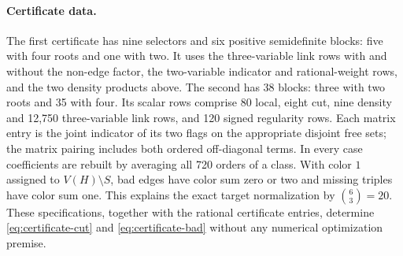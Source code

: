 \documentclass[11pt]{article}
\begin{document}
\begin{appendices}
\paragraph{Certificate data.}
The first certificate has nine selectors and six positive semidefinite
blocks: five with four roots and one with two. It uses the three-variable
link rows with and without the non-edge factor, the two-variable
indicator and rational-weight rows, and the two density products above.
The second has 38 blocks: three with two roots and 35 with four.
Its scalar rows comprise 80 local, eight cut, nine density and 12,750
three-variable link rows, and 120 signed regularity rows.
Each matrix entry is the joint indicator of its two flags on the
appropriate disjoint free sets; the matrix pairing includes both
ordered off-diagonal terms. In every case coefficients are rebuilt by
averaging all 720 orders of a class. With color $1$ assigned to
$V(H)\setminus S$, bad edges have color sum zero or two and missing
triples have color sum one. This explains the exact target normalization
by $\binom63=20$. These specifications, together with the rational
certificate entries, determine \eqref{eq:certificate-cut} and
\eqref{eq:certificate-bad} without any numerical optimization premise.

\end{appendices}
\end{document}
